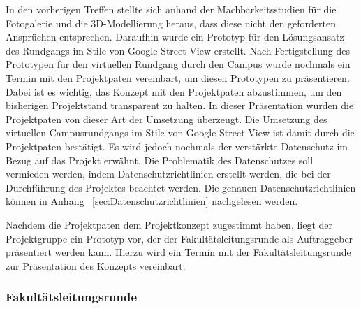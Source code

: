 In den vorherigen Treffen stellte sich anhand der Machbarkeitsstudien für die
Fotogalerie und die 3D-Modellierung heraus, dass diese nicht den geforderten
Ansprüchen entsprechen. Daraufhin wurde ein Prototyp für den Lösungsansatz des
Rundgangs im Stile von Google Street View erstellt. Nach Fertigstellung des
Prototypen für den virtuellen Rundgang durch den Campus wurde nochmals ein
Termin mit den Projektpaten vereinbart, um diesen Prototypen zu präsentieren.
Dabei ist es wichtig, das Konzept mit den Projektpaten abzustimmen, um den bisherigen Projektstand transparent zu halten. In dieser Präsentation wurden die Projektpaten von dieser Art der Umsetzung überzeugt. Die Umsetzung des
virtuellen Campusrundgangs im Stile von Google Street View ist damit durch die Projektpaten bestätigt. Es wird jedoch nochmals der verstärkte Datenschutz im Bezug auf das Projekt 
erwähnt. Die Problematik des Datenschutzes soll vermieden werden, indem Datenschutzrichtlinien erstellt werden, die bei 
der Durchführung des Projektes beachtet werden. Die genauen
Datenschutzrichtlinien können in Anhang ~\ref{sec:Datenschutzrichtlinien} nachgelesen werden.

Nachdem die Projektpaten dem Projektkonzept zugestimmt haben, liegt der Projektgruppe ein Prototyp vor, der der 
Fakultätsleitungsrunde als Auftraggeber präsentiert werden kann.
Hierzu wird ein Termin mit der Fakultätsleitungsrunde zur Präsentation des Konzepts vereinbart.


\subsubsection*{Fakultätsleitungsrunde}
\label{sec:Treffen4}


